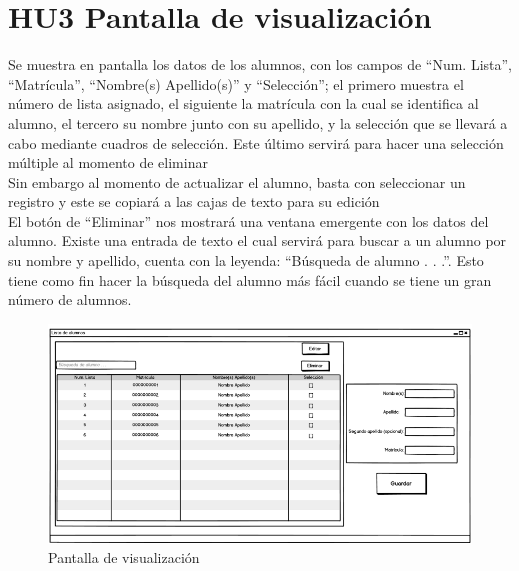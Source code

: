 
\section{HU3 Pantalla de visualización}

Se muestra en pantalla los datos de los alumnos, con los campos de “Num. Lista”, “Matrícula”, “Nombre(s) Apellido(s)” y “Selección”; el primero muestra el número de lista asignado, el siguiente la matrícula con la cual se identifica al alumno, el tercero su nombre junto con su apellido, y la selección que se llevará a cabo mediante cuadros de selección. 
Este último servirá para hacer una selección múltiple al momento de eliminar\\
Sin embargo al momento de actualizar el alumno, basta con seleccionar un registro y este se copiará a las cajas de texto para su edición \\
El botón de “Eliminar” nos mostrará una ventana emergente con los datos del alumno.
Existe una entrada de texto el cual servirá para buscar a un alumno por su nombre y apellido, cuenta con la leyenda: “Búsqueda de alumno . . .”. Esto tiene como fin hacer la búsqueda del alumno más fácil cuando se tiene un gran número de alumnos.

\begin{figure}[h]
	\centering
	\includegraphics[scale=0.5]{./HistoriasUsuario/imagenes/IHU6.png}
	\caption{Pantalla de visualización}
\end{figure}
